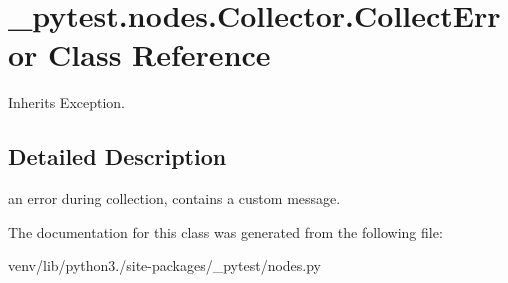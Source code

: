 \hypertarget{class__pytest_1_1nodes_1_1_collector_1_1_collect_error}{}\section{\+\_\+pytest.\+nodes.\+Collector.\+Collect\+Error Class Reference}
\label{class__pytest_1_1nodes_1_1_collector_1_1_collect_error}


Inherits Exception.



\subsection{Detailed Description}
\begin{DoxyVerb}an error during collection, contains a custom message. \end{DoxyVerb}
 

The documentation for this class was generated from the following file\+:\begin{DoxyCompactItemize}
\item 
venv/lib/python3./site-\/packages/\+\_\+pytest/nodes.\+py\end{DoxyCompactItemize}
